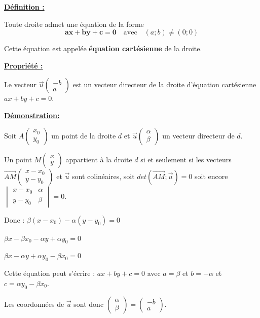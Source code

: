 \documentclass[12pt]{article}
\newcommand*{\Det}[4]{%
  \ensuremath{
    \begin{vmatrix} 
      #1 & #2 \\
      #3 & #4 
    \end{vmatrix}}}
\newcommand*{\Coord}[2]{%
  \ensuremath{
    \begin{pmatrix} 
      #1\\ 
      #2 
    \end{pmatrix}}}
\begin{document}
\vspace{5pt}

\begin{mdframed}[
    linewidth=1pt,
    roundcorner=5pt,
    linecolor=ForestGreen,
    innertopmargin=10pt,
    innerbottommargin=10pt
]
{\color{ForestGreen}
\textbf{\underline{Définition :}}}

\vspace{5pt}
Toute droite admet une équation de la forme 
\[
    \bm{ax + by + c = 0} \quad \text{avec} \quad (a;b) \neq (0;0)
\]

\vspace{5pt}
Cette équation est appelée \textbf{équation cartésienne} de la droite.

\end{mdframed}

\begin{mdframed}[
    linewidth=1pt,
    roundcorner=5pt,
    linecolor=Red,
    innertopmargin=10pt,
    innerbottommargin=5pt
]
{\color{red}
\textbf{\underline{Propriété :}}

\vspace{5pt}
 Le vecteur $\overrightarrow{u}\Coord{-b}{a}$ est un vecteur directeur de la droite 
 d’équation cartésienne $ax + by + c = 0$.
}
\end{mdframed}

\begin{mdframed}[
    linewidth=1pt,
    roundcorner=5pt,
    linecolor=RoyalBlue,
    innertopmargin=10pt,
    innerbottommargin=10pt
]
{\color{RoyalBlue}
\textbf{\underline{Démonstration:}}}

\vspace{5pt}
Soit $A\Coord{x_0}{y_0}$ un point de la droite $d$ et $\overrightarrow{u}
\Coord{\alpha}{\beta}$ un vecteur directeur de $d$.

Un point $M\Coord{x}{y}$ appartient à la droite $d$ si et seulement si les 
vecteurs $\overrightarrow{AM}\Coord{x-x_0}{y-y_0}$ et $\overrightarrow{u}$
sont colinéaires, soit $det(\overrightarrow{AM};\overrightarrow{u}) = 0$ soit encore 
$\Det{x-x_0}{\alpha}{y-y_0}{\beta} = 0$.

\vspace{5pt}
Donc : $\beta(x-x_0) - \alpha(y-y_0) = 0$

$\beta x - \beta x_0 - \alpha y + \alpha y_0 = 0$

$\beta x - \alpha y  + \alpha y_0 - \beta x_0 = 0$

\vspace{5pt}
Cette équation peut s'écrire : $ax + by + c = 0$ avec $a = \beta$ et $b = -\alpha$
et $c = \alpha y_0 - \beta x_0$.

Les coordonnées de $\overrightarrow{u}$ sont donc $\Coord{\alpha}{\beta} 
= \Coord{-b}{a}$.

\end{mdframed}
\end{document}
